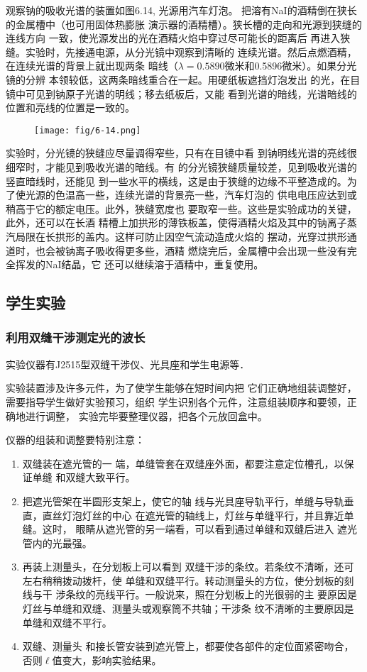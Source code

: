 观察钠的吸收光谱的装置如图6.14, 光源用汽车灯泡。
把溶有NaI的酒精倒在狭长的金属槽中（也可用固体热膨胀
演示器的酒精槽）。狭长槽的走向和光源到狭缝的连线方向
一致，使光源发出的光在酒精火焰中穿过尽可能长的距离后
再进入狭缝。实验时，先接通电源，从分光镜中观察到清晰的
连续光谱。然后点燃酒精，在连续光谱的背景上就出现两条
暗线（$\lambda=0.5890$微米和0.5896微米）。如果分光镜的分辨
本领较低，这两条暗线重合在一起。用硬纸板遮挡灯泡发出
的光，在目镜中可见到钠原子光谱的明线；移去纸板后，又能
看到光谱的暗线，光谱暗线的位置和亮线的位置是一致的。
\begin{figure}[htp]
    \centering
\texttt{[image: fig/6-14.png]}
    \caption{}
\end{figure}

实验时，分光镜的狭缝应尽量调得窄些，只有在目镜中看
到钠明线光谱的亮线很细窄时，才能见到吸收光谱的暗线。有
的分光镜狭缝质量较差，见到吸收光谱的竖直暗线时，还能见
到一些水平的横线，这是由于狭缝的边缘不平整造成的。为
了使光源的色温高一些，连续光谱的背景亮一些，汽车灯泡的
供电电压应达到或稍高于它的额定电压。此外，狭缝宽度也
要取窄一些。这些是实验成功的关键，此外，还可以在长酒
精槽上加拱形的薄铁板盖，使得酒精火焰及其中的钠离子蒸
汽局限在长拱形的盖内。这样可防止因空气流动造成火焰的
摆动，光穿过拱形通道时，也会被钠离子吸收得更多些，酒精
燃烧完后，金属槽中会出现一些没有完全挥发的NaI结晶，它
还可以继续溶于酒精中，重复使用。

\subsection{学生实验}
\subsubsection{利用双缝干涉测定光的波长}
实验仪器有J2515型双缝干涉仪、光具座和学生电源等．

实验装置涉及许多元件，为了使学生能够在短时间内把
它们正确地组装调整好，需要指导学生做好实验预习，组织
学生识别各个元件，注意组装顺序和要领，正确地进行调整，
实验完毕要整理仪器，把各个元放回盒中。

仪器的组装和调整要特别注意：
\begin{enumerate}
\item 双缝装在遮光管的一
端，单缝管套在双缝座外面，都要注意定位槽孔，以保证单缝
和双缝大致平行。    
\item 把遮光管架在半圆形支架上，使它的轴
线与光具座导轨平行，单缝与导轨垂直，直丝灯泡灯丝的中心
在遮光管的轴线上，灯丝与单缝平行，并且靠近单缝。这时，
眼睛从遮光管的另一端看，可以看到通过单缝和双缝后进入
遮光管内的光最强。    
\item 再装上测量头，在分划板上可以看到
双缝干涉的条纹。若条纹不清晰，还可左右稍稍拨动拨杆，使
单缝和双缝平行。转动测量头的方位，使分划板的刻线与干
涉条纹的亮线平行。一般说来，照在分划板上的光很弱的主
要原因是灯丝与单缝和双缝、测量头或观察筒不共轴；干涉条
纹不清晰的主要原因是单缝和双缝不平行。   
\item 双缝、测量头
和接长管安装到遮光管上，都要使各部件的定位面紧密吻合，
否则$\ell$值变大，影响实验结果。
\end{enumerate}

